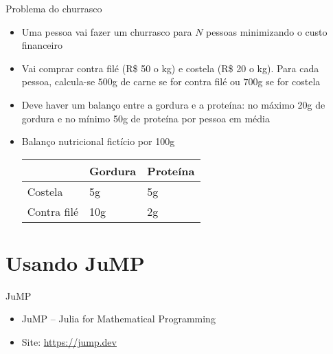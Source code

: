 \documentclass[10pt]{beamer}
\begin{document}
\begin{frame}{Problema do churrasco}

  \begin{itemize}
  \item Uma pessoa vai fazer um churrasco para $N$ pessoas
    \alert{minimizando o custo financeiro}
    
  \item Vai comprar contra filé (R\$ 50 o kg) e costela (R\$ 20 o
    kg). Para cada pessoa, calcula-se $500$g de carne se for contra
    filé ou $700$g se for costela
    
  \item Deve haver um balanço entre a gordura e a proteína: no máximo
    20g de gordura e no mínimo 50g de proteína por pessoa em média

  \item Balanço nutricional fictício por 100g

    \begin{center}
      \begin{tabular}{lll}
        \hline
        & Gordura & Proteína \\ \hline
        Costela & 5g & 5g \\ \hline
        Contra filé & 10g & 2g \\ \hline
      \end{tabular}
    \end{center}
  \end{itemize}
  
\end{frame}

\section{Usando JuMP}

\begin{frame}{JuMP}

  \begin{itemize}
  \item JuMP -- Julia for Mathematical Programming

  \item Site: \url{https://jump.dev}
  \end{itemize}
  
\end{frame}
\end{document}

